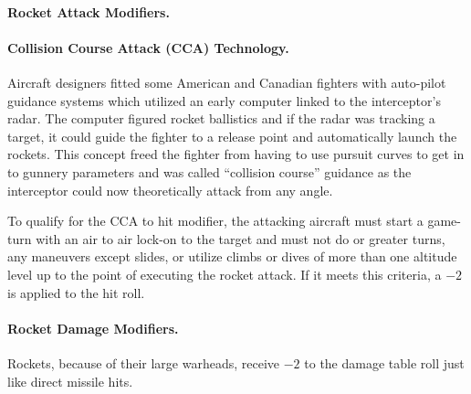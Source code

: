 \begin{advancedrules}
\paragraph{Rocket Attack Modifiers.} 

\paragraph{Collision Course Attack (CCA) Technology.} Aircraft designers fitted some American and Canadian fighters with auto-pilot guidance systems which utilized an early computer linked to the interceptor's radar. The computer figured rocket ballistics and if the radar was tracking a target, it could guide the fighter to a release point and automatically launch the rockets. This concept freed the fighter from having to use pursuit curves to get in to gunnery parameters and was called “collision course” guidance as the interceptor could now theoretically attack from any angle.

To qualify for the CCA to hit modifier, the attacking aircraft must start a game-turn with an air to air lock-on to the target and must not do  or greater turns, any maneuvers except slides, or utilize climbs or dives of more than one altitude level up to the point of executing the rocket attack. If it meets this criteria, a $-2$ is applied to the hit roll.

\paragraph{Rocket Damage Modifiers.} Rockets, because of their large warheads, receive $-2$ to the damage table roll just like direct missile hits.


\end{advancedrules}
